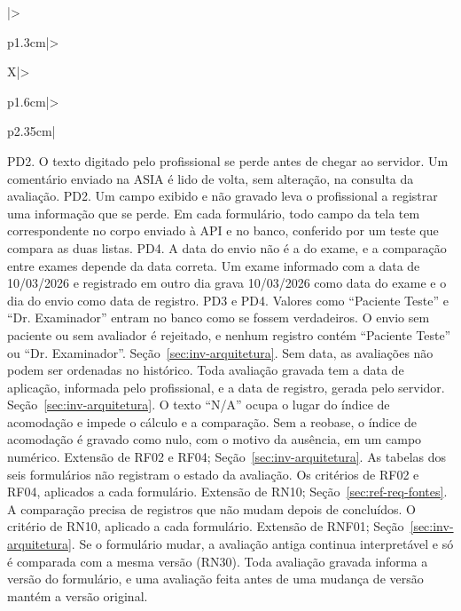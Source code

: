 \begin{apendicesenv}
{\begin{xltabular}{\textwidth}{|>{\raggedright\arraybackslash}p{1.3cm}|>{\raggedright\arraybackslash}X|>{\raggedright\arraybackslash}p{1.6cm}|>{\raggedright\arraybackslash}p{2.35cm}|}
		{PD2.}
		{O texto digitado pelo profissional se perde antes de chegar ao servidor.}
		{Um comentário enviado na ASIA é lido de volta, sem alteração, na consulta da avaliação.}
		{PD2.}
		{Um campo exibido e não gravado leva o profissional a registrar uma informação que se perde.}
		{Em cada formulário, todo campo da tela tem correspondente no corpo enviado à API e no banco, conferido por um
		teste que compara as duas listas.}
		{PD4.}
		{A data do envio não é a do exame, e a comparação entre exames depende da data correta.}
		{Um exame informado com a data de 10/03/2026 e registrado em outro dia grava 10/03/2026 como data do exame e o
		dia do envio como data de registro.}
		{PD3 e PD4.}
		{Valores como ``Paciente Teste'' e ``Dr. Examinador'' entram no banco como se fossem verdadeiros.}
		{O envio sem paciente ou sem avaliador é rejeitado, e nenhum registro contém ``Paciente Teste'' ou
		``Dr. Examinador''.}
		{Seção~\ref{sec:inv-arquitetura}.}
		{Sem data, as avaliações não podem ser ordenadas no histórico.}
		{Toda avaliação gravada tem a data de aplicação, informada pelo profissional, e a data de registro, gerada
		pelo servidor.}
		{Seção~\ref{sec:inv-arquitetura}.}
		{O texto ``N/A'' ocupa o lugar do índice de acomodação e impede o cálculo e a comparação.}
		{Sem a reobase, o índice de acomodação é gravado como nulo, com o motivo da ausência, em um campo numérico.}
		{Extensão de RF02 e RF04; Seção~\ref{sec:inv-arquitetura}.}
		{As tabelas dos seis formulários não registram o estado da avaliação.}
		{Os critérios de RF02 e RF04, aplicados a cada formulário.}
		{Extensão de RN10; Seção~\ref{sec:ref-req-fontes}.}
		{A comparação precisa de registros que não mudam depois de concluídos.}
		{O critério de RN10, aplicado a cada formulário.}
		{Extensão de RNF01; Seção~\ref{sec:inv-arquitetura}.}
		{Se o formulário mudar, a avaliação antiga continua interpretável e só é comparada com a mesma versão (RN30).}
		{Toda avaliação gravada informa a versão do formulário, e uma avaliação feita antes de uma mudança de versão
		mantém a versão original.}


\end{xltabular}}
\end{apendicesenv}
